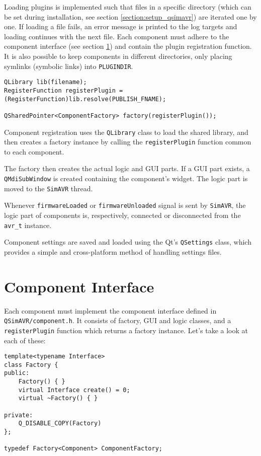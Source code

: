 Loading plugins is implemented such that files in a specific directory (which can be
set during installation, see section \ref{section:setup_qsimavr}) are iterated
one by one. If loading a file fails, an error message is printed to the log targets
and loading continues with the next file. Each component must adhere to the
component interface (see section \ref{section:component_interface}) and contain
the plugin registration function.
It is also possible to keep components
in different directories, only placing symlinks (symbolic links) into
\lstinline|PLUGINDIR|.

\begin{lstlisting}
QLibrary lib(filename);
RegisterFunction registerPlugin = (RegisterFunction)lib.resolve(PUBLISH_FNAME);

QSharedPointer<ComponentFactory> factory(registerPlugin());
\end{lstlisting}

Component registration uses the \lstinline|QLibrary| class to load the shared library,
and then creates a factory instance by calling the \lstinline|registerPlugin|
function common to each component.

The factory then creates the actual logic and \ac{GUI} parts. If a \ac{GUI} part
exists, a \lstinline|QMdiSubWindow| is created containing the component's widget.
The logic part is moved to the \lstinline|SimAVR| thread.

Whenever \lstinline|firmwareLoaded| or \lstinline|firmwareUnloaded| signal is sent
by \lstinline|SimAVR|, the logic part of components is, respectively, connected
or disconnected from the \lstinline|avr_t| instance.

Component settings are saved and loaded using the Qt's \lstinline|QSettings|
class, which provides a simple and cross-platform method of handling settings
files.

\section{Component Interface} \label{section:component_interface}

Each component must implement the component interface defined in
\verb|QSimAVR/component.h|. It consists of factory, \ac{GUI} and logic classes,
and a \lstinline|registerPlugin| function which returns a factory instance. Let's
take a look at each of these:

\begin{lstlisting}
template<typename Interface>
class Factory {
public:
    Factory() { }
    virtual Interface create() = 0;
    virtual ~Factory() { }

private:
    Q_DISABLE_COPY(Factory)
};

typedef Factory<Component> ComponentFactory;
\end{lstlisting}

